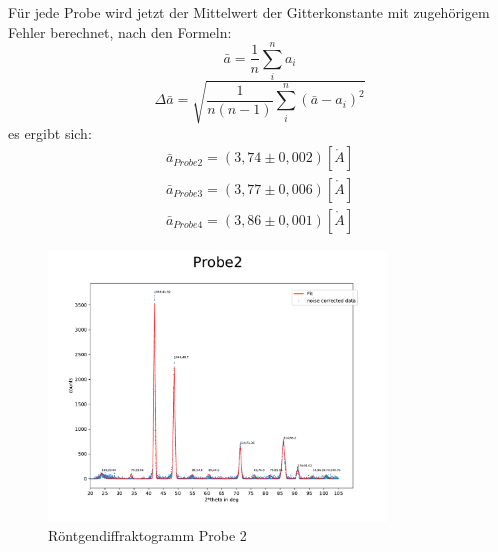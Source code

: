             Für jede Probe wird jetzt der Mittelwert der Gitterkonstante mit zugehörigem
            Fehler berechnet, nach den Formeln:
            \begin{equation}
                \bar{a} = \frac{1}{n} \sum^n_i a_i
            \end{equation}
            \begin{equation}
                \Delta \bar{a} = \sqrt{\frac{1}{n(n-1)} \sum^n_i (\bar{a}-a_i)^2}
            \end{equation}  
            es ergibt sich:
            \begin{align*}
                \bar{a}_{Probe2} = (3,74 \pm 0,002)[\mathring{A}]\\
                \bar{a}_{Probe3} = (3,77 \pm 0,006)[\mathring{A}]\\
                \bar{a}_{Probe4} = (3,86 \pm 0,001)[\mathring{A}]
            \end{align*}
            \begin{figure}[H]
                \centering
                \includegraphics[width=0.8\textwidth]{Messdaten/Auswertungsskripte/Probe2.pdf}
                \caption{Röntgendiffraktogramm Probe 2}
                \label{Röntgendiffraktogramm Probe 2}
            \end{figure}
        
